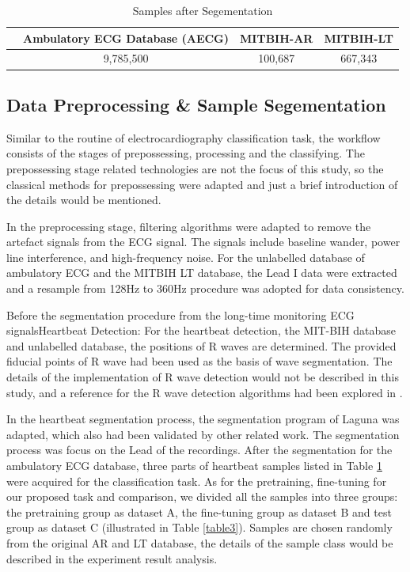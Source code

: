 \documentclass[journal]{IEEEtran}
\begin{document}
\begin{table}[!htbp]
\begin{center}
\begin{threeparttable}
\caption{Samples after Segementation}

\label{table2}
\begin{tabular}{cccc}
\hline
& Ambulatory ECG Database (AECG) & MITBIH-AR &  MITBIH-LT\\
\hline
& 9,785,500 & 100,687 &  667,343 \\
\hline
\end{tabular}
\end{threeparttable}
\end{center}
\end{table}


\subsection{Data Preprocessing \& Sample Segementation}
Similar to the routine of electrocardiography classification task, the workflow consists of the stages of prepossessing, processing  and the classifying. The prepossessing stage related technologies are not the focus of this study, so the classical methods for prepossessing were adapted and just a brief introduction of the details would be mentioned. 

In the preprocessing stage, filtering algorithms were adapted to remove the artefact signals from the ECG signal. The signals include baseline wander, power line interference, and high-frequency noise. For the unlabelled database of ambulatory ECG and the MITBIH LT database, the Lead I data were extracted and a resample from 128Hz to 360Hz procedure was adopted for data consistency.

Before the segmentation procedure from the long-time monitoring ECG signalsHeartbeat Detection: For the heartbeat detection, the MIT-BIH database and unlabelled database, the positions of R waves are determined. The provided fiducial points of R wave had been used as the basis of wave segmentation. The details of the implementation of R wave detection would not be described in this study, and a reference for the R wave detection algorithms had been explored in \cite{afonso}.

In the heartbeat segmentation process, the segmentation program of Laguna \cite{sornmo2006electrocardiogram} was adapted, which also had been validated by other related work\cite{chaza}. The segmentation process was focus on the Lead  \uppercase\expandafter{} of the recordings. After the segmentation for the ambulatory ECG database, three parts of heartbeat samples listed in Table \ref{table2} were acquired for the classification task. As for the pretraining, fine-tuning for our proposed task and comparison, we divided all the samples into three groups: the pretraining group as dataset A, the fine-tuning group as dataset B and test group as dataset C (illustrated in Table \ref{table3}). Samples are chosen randomly from the original AR and LT database, the details of the sample class would be described in the experiment result analysis.
\end{document}
